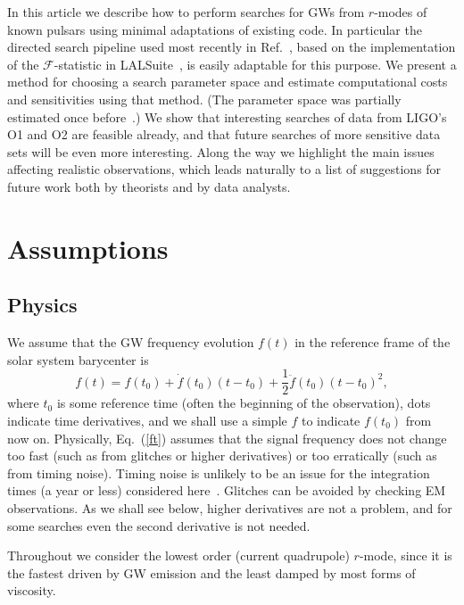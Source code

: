\documentclass{ttuthes2007}
\begin{document}
In this article we describe how to perform searches for \acp{GW} from
$r$-modes of known pulsars using minimal adaptations of existing code.
In particular the directed search pipeline used most recently in
Ref.~\cite{Abbott:2018qee}, based on the implementation of the
$\mathcal{F}$-statistic in LALSuite~\cite{LALSuite}, is easily adaptable for
this purpose.
We present a method for choosing a search parameter space and estimate
computational costs and sensitivities using that method.
(The parameter space was partially estimated once before~\cite{Ian}.)
We show that interesting searches of data from LIGO's \ac{O1} and \ac{O2} are
feasible already, and that future searches of more sensitive data sets will be
even more interesting.
Along the way we highlight the main issues affecting realistic observations,
which leads naturally to a list of suggestions for future work both by
theorists and by data analysts.

\section{Assumptions}

\subsection{Physics}

We assume that the \ac{GW} frequency evolution $f(t)$ in the reference frame
of the solar system barycenter is
\begin{equation}
\label{ft}
f(t) = f\left( t_0 \right) + \dot f\left( t_0 \right) \left( t-t_0 \right) +
\frac{1}{2} \ddot f\left( t_0 \right) \left( t-t_0 \right)^2,
\end{equation}
where $t_0$ is some reference time (often the beginning of the observation),
dots indicate time derivatives, and we shall use a simple $f$ to indicate
$f(t_0)$ from now on.
Physically, Eq.~(\ref{ft}) assumes that the signal frequency does not change
too fast (such as from glitches or higher derivatives) or too erratically
(such as from timing noise).
Timing noise is unlikely to be an issue for the integration times (a year or
less) considered here~\cite{Ashton:2014qya}.
Glitches can be avoided by checking \ac{EM} observations.
As we shall see below, higher derivatives are not a problem, and for some
searches even the second derivative is not needed.

Throughout we consider the lowest order (current quadrupole) $r$-mode, since
it is the fastest driven by \ac{GW} emission and the least damped by most
forms of viscosity.
\end{document}
